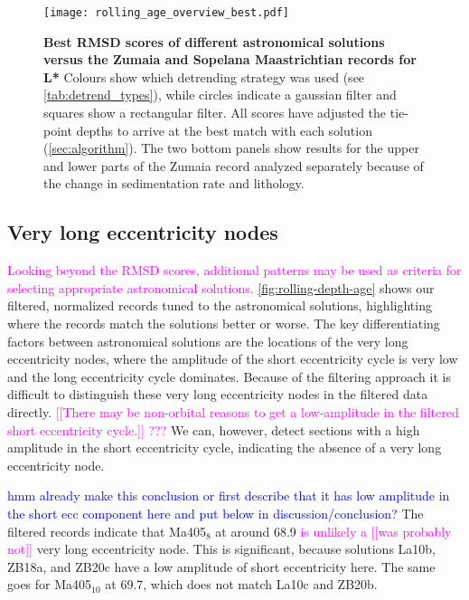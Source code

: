 \documentclass[draft]{agujournal2019}
\newcommand{\rez}{\textcolor{magenta}}
\newcommand{\ijk}{\textcolor{blue}}
\begin{document}
\begin{figure}[htb]
  \centering
  \texttt{[image: rolling\_age\_overview\_best.pdf]}
  \caption{\label{fig:rolling-rmsd}
    \textbf{Best \gls{RMSD} scores of different astronomical solutions versus the Zumaia and Sopelana Maastrichtian records for \gls{L*}}
    Colours show which detrending strategy was used (see \cref{tab:detrend_types}), while circles indicate a gaussian filter and squares show a rectangular filter.
    All scores have adjusted the tie-point depths to arrive at the best match with each solution (\cref{sec:algorithm}).
    The two bottom panels show results for the upper and lower parts of the Zumaia record analyzed separately because of the change in sedimentation rate and lithology.
}
\end{figure}

\subsection{Very long eccentricity nodes}

\rez{Looking beyond the \gls{RMSD} scores, additional patterns may be used as criteria for selecting appropriate astronomical solutions.}
\cref{fig:rolling-depth-age} shows our filtered, normalized records tuned to the astronomical solutions, highlighting where the records match the solutions better or worse.
The key differentiating factors between astronomical solutions are the locations of the very long eccentricity nodes, where the amplitude of the short eccentricity cycle is very low and the long eccentricity cycle dominates.
Because of the filtering approach it is difficult to distinguish these very long eccentricity nodes in the filtered data directly.
\rez{[[There may be non-orbital reasons to get a low-amplitude in the filtered short eccentricity cycle.]] ???}
We can, however, detect sections with a high amplitude in the short eccentricity cycle, indicating the absence of a very long eccentricity node.

\ijk{hmm already make this conclusion or first describe that it has low amplitude in the short ecc component here and put below in discussion/conclusion?}
The filtered records indicate that Ma405\(_{8}\) at around \qty{68.9}{\millionyearago} \rez{is unlikely a [[was probably not]]} very long eccentricity node.
This is significant, because solutions La10b, ZB18a, and ZB20c have a low amplitude of short eccentricity here.
The same goes for Ma405\(_{10}\) at \qty{69.7}{\millionyearago}, which does not match La10c and ZB20b.
\end{document}

